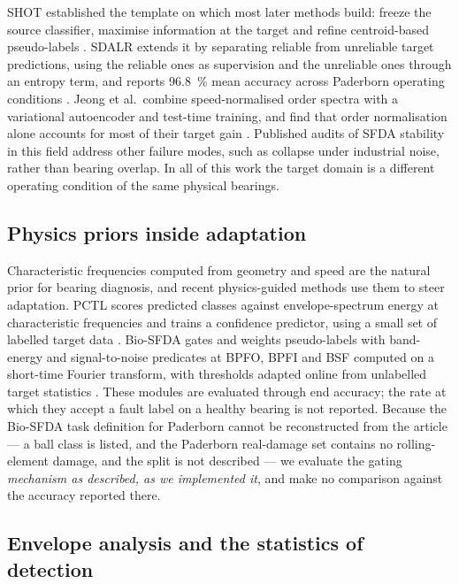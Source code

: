 SHOT established the template on which most later methods build: freeze the source classifier, maximise information at the
target and refine centroid-based pseudo-labels \cite{liang2020shot}. SDALR extends it by separating reliable from unreliable
target predictions, using the reliable ones as supervision and the unreliable ones through an entropy term, and reports
\SI{96.8}{\percent} mean accuracy across Paderborn operating conditions \cite{sdalr2025}. Jeong et al.\ combine
speed-normalised order spectra with a variational autoencoder and test-time training, and find that order normalisation alone
accounts for most of their target gain \cite{jeong2025}. Published audits of SFDA stability in this field address other
failure modes, such as collapse under industrial noise, rather than bearing overlap. In all of this work the target domain is
a different operating condition of the same physical bearings.

\subsection{Physics priors inside adaptation}

Characteristic frequencies computed from geometry and speed are the natural prior for bearing diagnosis, and recent
physics-guided methods use them to steer adaptation. PCTL scores predicted classes against envelope-spectrum energy at
characteristic frequencies and trains a confidence predictor, using a small set of labelled target data \cite{pctl2026}.
Bio-SFDA gates and weights pseudo-labels with band-energy and signal-to-noise predicates at BPFO, BPFI and BSF computed on a
short-time Fourier transform, with thresholds adapted online from unlabelled target statistics \cite{yoon2026biosfda}. These
modules are evaluated through end accuracy; the rate at which they accept a fault label on a healthy bearing is not reported.
Because the Bio-SFDA task definition for Paderborn cannot be reconstructed from the article --- a ball class is listed, and
the Paderborn real-damage set contains no rolling-element damage, and the split is not described --- we evaluate the gating
\emph{mechanism as described, as we implemented it}, and make no comparison against the accuracy reported there.

\subsection{Envelope analysis and the statistics of detection}


